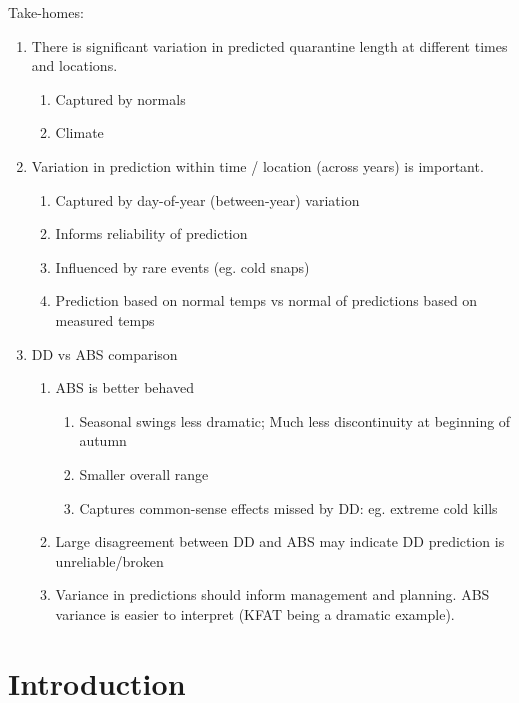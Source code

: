 \documentclass[10pt,a4paper,twocolumn]{article}
\begin{document}
Take-homes:
\begin{enumerate}
\item There is significant variation in predicted quarantine length 
at different times and locations.
  \begin{enumerate}
  \item Captured by normals
  \item Climate
  \end{enumerate}
\item Variation in prediction within time / location (across years) 
is important.
  \begin{enumerate}
  \item Captured by day-of-year (between-year) variation
  \item Informs reliability of prediction
  \item Influenced by rare events (eg. cold snaps)
  \item Prediction based on normal temps vs normal 
  of predictions based on measured temps
  \end{enumerate}
\item DD vs ABS comparison
  \begin{enumerate}
  \item ABS is better behaved
    \begin{enumerate}
    \item Seasonal swings less dramatic; 
    Much less discontinuity at beginning of autumn 
    \item Smaller overall range
    \item Captures common-sense effects missed by DD: 
    eg. extreme cold kills
    \end{enumerate}
  \item Large disagreement between DD and ABS may indicate 
  DD prediction is unreliable/broken
  \item Variance in predictions should inform management and planning.
  ABS variance is easier to interpret (KFAT being a dramatic example).
  \end{enumerate}
\end{enumerate}


\section*{Introduction}
\end{document}

